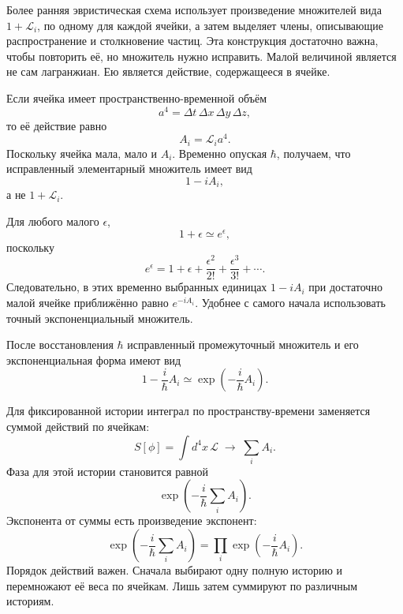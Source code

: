 Более ранняя эвристическая схема использует произведение множителей вида \(1+\mathcal{L}_i\), по одному для каждой ячейки, а затем выделяет члены, описывающие распространение и столкновение частиц. Эта конструкция достаточно важна, чтобы повторить её, но множитель нужно исправить. Малой величиной является не сам лагранжиан. Ею является действие, содержащееся в ячейке.

Если ячейка имеет пространственно-временной объём
\begin{equation}
a^4=\Delta t\,\Delta x\,\Delta y\,\Delta z,
\end{equation}
то её действие равно
\begin{equation}
A_i=\mathcal{L}_i a^4.
\end{equation}
Поскольку ячейка мала, мало и \(A_i\). Временно опуская \(\hbar\), получаем, что исправленный элементарный множитель имеет вид
\begin{equation}
1-iA_i,
\end{equation}
а не \(1+\mathcal{L}_i\).

Для любого малого \(\epsilon\),
\begin{equation}
1+\epsilon\simeq e^\epsilon,
\end{equation}
поскольку
\begin{equation}
e^\epsilon
=1+\epsilon+\frac{\epsilon^2}{2!}
+\frac{\epsilon^3}{3!}+\cdots.
\end{equation}
Следовательно, в этих временно выбранных единицах \(1-iA_i\) при достаточно малой ячейке приближённо равно \(e^{-iA_i}\). Удобнее с самого начала использовать точный экспоненциальный множитель.

\begin{classroomqa}
\end{classroomqa}

После восстановления \(\hbar\) исправленный промежуточный множитель и его экспоненциальная форма имеют вид
\begin{equation}
1-\frac{i}{\hbar}A_i
\simeq
\exp\!\left(-\frac{i}{\hbar}A_i\right).
\end{equation}

Для фиксированной истории интеграл по пространству-времени заменяется суммой действий по ячейкам:
\begin{equation}
S[\phi]
=\int d^4x\,\mathcal{L}
\;\longrightarrow\;
\sum_i A_i.
\end{equation}
Фаза для этой истории становится равной
\begin{equation}
\exp\!\left(-\frac{i}{\hbar}\sum_i A_i\right).
\end{equation}
Экспонента от суммы есть произведение экспонент:
\begin{equation}
\exp\!\left(-\frac{i}{\hbar}\sum_i A_i\right)
=
\prod_i\exp\!\left(-\frac{i}{\hbar}A_i\right).
\end{equation}
Порядок действий важен. Сначала выбирают одну полную историю и перемножают её веса по ячейкам. Лишь затем суммируют по различным историям.

